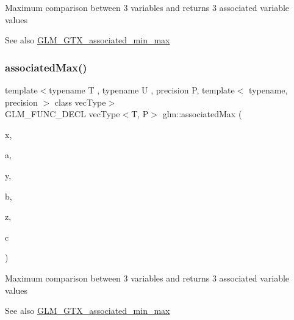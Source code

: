 Maximum comparison between 3 variables and returns 3 associated variable values \begin{DoxySeeAlso}{See also}
\hyperlink{group__gtx__associated__min__max}{G\+L\+M\+\_\+\+G\+T\+X\+\_\+associated\+\_\+min\+\_\+max} 
\end{DoxySeeAlso}
\mbox{\label{group__gtx__associated__min__max_ga553431a468e251623408603bcb51c9cb}} 
\subsubsection{\texorpdfstring{associated\+Max()}{associatedMax()}\hspace{0.1cm}{\footnotesize\ttfamily [7/12]}}
{\footnotesize\ttfamily template$<$typename T , typename U , precision P, template$<$ typename, precision $>$ class vec\+Type$>$ \\
G\+L\+M\+\_\+\+F\+U\+N\+C\+\_\+\+D\+E\+CL vec\+Type$<$T, P$>$ glm\+::associated\+Max (\begin{DoxyParamCaption}\item[{T}]{x,  }\item[{vec\+Type$<$ U, P $>$ const \&}]{a,  }\item[{T}]{y,  }\item[{vec\+Type$<$ U, P $>$ const \&}]{b,  }\item[{T}]{z,  }\item[{vec\+Type$<$ U, P $>$ const \&}]{c }\end{DoxyParamCaption})}

Maximum comparison between 3 variables and returns 3 associated variable values \begin{DoxySeeAlso}{See also}
\hyperlink{group__gtx__associated__min__max}{G\+L\+M\+\_\+\+G\+T\+X\+\_\+associated\+\_\+min\+\_\+max} 
\end{DoxySeeAlso}
\mbox{\label{group__gtx__associated__min__max_ga327136e6a568569c03a056f90814b656}} 
